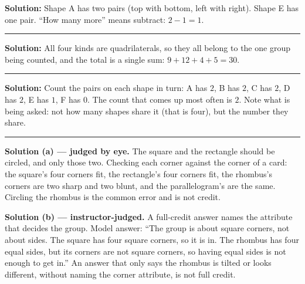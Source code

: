 \documentclass[12pt]{article}
\begin{document}

\textbf{Solution:} Shape A has two pairs (top with bottom, left with right). Shape E has one pair.
``How many more'' means subtract: $2 - 1 = 1$. 

\vspace{0.15cm}\noindent\rule{\linewidth}{0.2pt}


\textbf{Solution:} All four kinds are quadrilaterals, so they all belong to the one group being
counted, and the total is a single sum: $9 + 12 + 4 + 5 = 30$. 

\vspace{0.15cm}\noindent\rule{\linewidth}{0.2pt}


\textbf{Solution:} Count the pairs on each shape in turn: A has $2$, B has $2$, C has $2$, D has $2$,
E has $1$, F has $0$. The count that comes up most often is $2$. Note what is being asked: not how
many shapes share it (that is four), but the number they share. 

\vspace{0.15cm}\noindent\rule{\linewidth}{0.2pt}


\textbf{Solution (a) --- judged by eye.} The square and the rectangle should be circled, and only
those two. Checking each corner against the corner of a card: the square's four corners fit, the
rectangle's four corners fit, the rhombus's corners are two sharp and two blunt, and the
parallelogram's are the same. Circling the rhombus is the common error and is not credit.

\textbf{Solution (b) --- instructor-judged.} A full-credit answer names the attribute that decides the
group. Model answer: ``The group is about square corners, not about sides. The square has four square
corners, so it is in. The rhombus has four equal sides, but its corners are not square corners, so
having equal sides is not enough to get in.'' An answer that only says the rhombus is tilted or
looks different, without naming the corner attribute, is not full credit.
\end{document}
